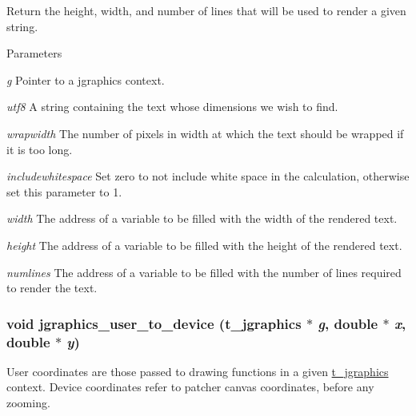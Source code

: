 Return the height, width, and number of lines that will be used to render a given string. 
\begin{DoxyParams}{Parameters}
\item[{\em g}]Pointer to a jgraphics context. \item[{\em utf8}]A string containing the text whose dimensions we wish to find. \item[{\em wrapwidth}]The number of pixels in width at which the text should be wrapped if it is too long. \item[{\em includewhitespace}]Set zero to not include white space in the calculation, otherwise set this parameter to 1. \item[{\em width}]The address of a variable to be filled with the width of the rendered text. \item[{\em height}]The address of a variable to be filled with the height of the rendered text. \item[{\em numlines}]The address of a variable to be filled with the number of lines required to render the text. \end{DoxyParams}
\hypertarget{group__jgraphics_ga67774b45773c5a559c756bd57167dd83}{
\subsubsection[{jgraphics\_\-user\_\-to\_\-device}]{\setlength{\rightskip}{0pt plus 5cm}void jgraphics\_\-user\_\-to\_\-device ({\bf t\_\-jgraphics} $\ast$ {\em g}, \/  double $\ast$ {\em x}, \/  double $\ast$ {\em y})}}
\label{group__jgraphics_ga67774b45773c5a559c756bd57167dd83}


User coordinates are those passed to drawing functions in a given \hyperlink{group__jgraphics_ga4bf27bd7e21a59a427481b909d4656e7}{t\_\-jgraphics} context. Device coordinates refer to patcher canvas coordinates, before any zooming. 